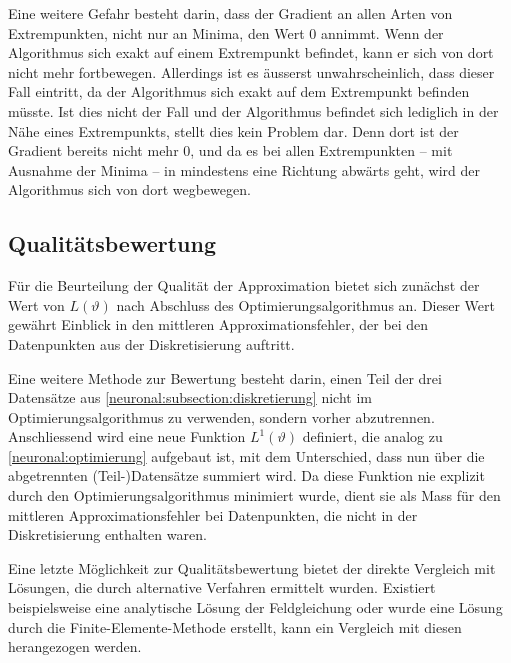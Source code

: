 Eine weitere Gefahr besteht darin, dass der Gradient an allen Arten von Extrempunkten, nicht nur an Minima, den Wert 0 annimmt.
Wenn der Algorithmus sich exakt auf einem Extrempunkt befindet, kann er sich von dort nicht mehr fortbewegen.
Allerdings ist es äusserst unwahrscheinlich, dass dieser Fall eintritt, da der Algorithmus sich exakt auf dem Extrempunkt befinden müsste.
Ist dies nicht der Fall und der Algorithmus befindet sich lediglich in der Nähe eines Extrempunkts, stellt dies kein Problem dar.
Denn dort ist der Gradient bereits nicht mehr 0, und da es bei allen Extrempunkten -- mit Ausnahme der Minima -- in mindestens eine Richtung abwärts geht, wird der Algorithmus sich von dort wegbewegen.

\subsection{Qualitätsbewertung}\label{neuronal:subsection:qualitätsbewertung}
Für die Beurteilung der Qualität der Approximation bietet sich zunächst der Wert von \( L(\vartheta) \) nach Abschluss des Optimierungsalgorithmus an.
Dieser Wert gewährt Einblick in den mittleren Approximationsfehler, der bei den Datenpunkten aus der Diskretisierung auftritt.

Eine weitere Methode zur Bewertung besteht darin, einen Teil der drei Datensätze aus \ref{neuronal:subsection:diskretierung} nicht im Optimierungsalgorithmus zu verwenden, sondern vorher abzutrennen.
Anschliessend wird eine neue Funktion \( L^1(\vartheta) \) definiert, die analog zu \eqref{neuronal:optimierung} aufgebaut ist, mit dem Unterschied, dass nun über die abgetrennten (Teil-)Datensätze summiert wird.
Da diese Funktion nie explizit durch den Optimierungsalgorithmus minimiert wurde, dient sie als Mass für den mittleren Approximationsfehler bei Datenpunkten, die nicht in der Diskretisierung enthalten waren.

Eine letzte Möglichkeit zur Qualitätsbewertung bietet der direkte Vergleich mit Lösungen, die durch alternative Verfahren ermittelt wurden.
Existiert beispielsweise eine analytische Lösung der Feldgleichung oder wurde eine Lösung durch die Finite-Elemente-Methode erstellt, kann ein Vergleich mit diesen herangezogen werden.
